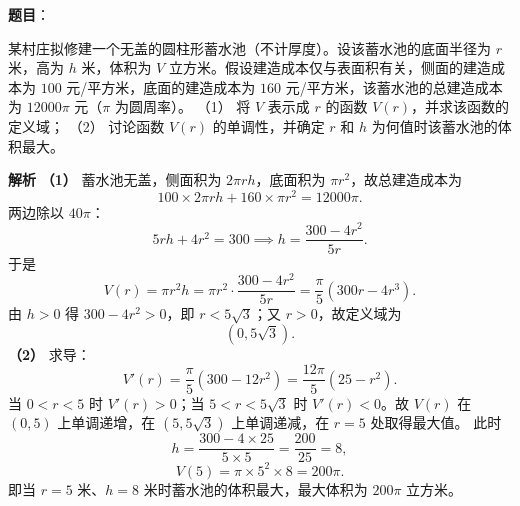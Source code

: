 \begin{answer}

\textbf{题目}：

某村庄拟修建一个无盖的圆柱形蓄水池（不计厚度）。设该蓄水池的底面半径为 $r$ 米，高为 $h$ 米，体积为 $V$ 立方米。假设建造成本仅与表面积有关，侧面的建造成本为 $100$ 元/平方米，底面的建造成本为 $160$ 元/平方米，该蓄水池的总建造成本为 $12000\pi$ 元（$\pi$ 为圆周率）。
（1） 将 $V$ 表示成 $r$ 的函数 $V(r)$，并求该函数的定义域；
（2） 讨论函数 $V(r)$ 的单调性，并确定 $r$ 和 $h$ 为何值时该蓄水池的体积最大。

\textbf{解析}
\textbf{（1）} 蓄水池无盖，侧面积为 $2\pi rh$，底面积为 $\pi r^2$，故总建造成本为
\nopagebreak[4]
\[100\times2\pi rh+160\times\pi r^2=12000\pi.\]
两边除以 $40\pi$：
\nopagebreak[4]
\[5rh+4r^2=300\implies h=\frac{300-4r^2}{5r}.\]
于是
\nopagebreak[4]
\[V(r)=\pi r^2h=\pi r^2\cdot\frac{300-4r^2}{5r}=\frac\pi5(300r-4r^3).\]
由 $h>0$ 得 $300-4r^2>0$，即 $r<5\sqrt3$；又 $r>0$，故定义域为
\nopagebreak[4]
\[(0,5\sqrt3).\]
\textbf{（2）} 求导：
\nopagebreak[4]
\[V'(r)=\frac\pi5(300-12r^2)=\frac{12\pi}5(25-r^2).\]
当 $0<r<5$ 时 $V'(r)>0$；当 $5<r<5\sqrt3$ 时 $V'(r)<0$。故 $V(r)$ 在 $(0,5)$ 上单调递增，在 $(5,5\sqrt3)$ 上单调递减，在 $r=5$ 处取得最大值。
此时
\nopagebreak[4]
\[h=\frac{300-4\times25}{5\times5}=\frac{200}{25}=8,\]
\nopagebreak[4]
\[V(5)=\pi\times5^2\times8=200\pi.\]
即当 $r=5$ 米、$h=8$ 米时蓄水池的体积最大，最大体积为 $200\pi$ 立方米。



\end{answer}
